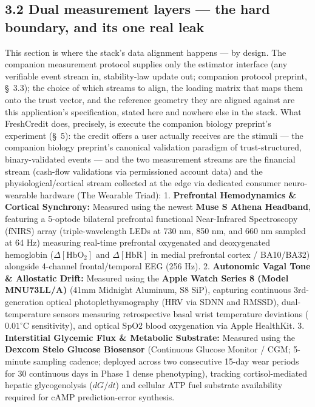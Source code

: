 \documentclass[
]{article}
\begin{document}
\subsection{3.2 Dual measurement layers --- the hard boundary, and its
one real
leak}\label{dual-measurement-layers-the-hard-boundary-and-its-one-real-leak}

This section is where the stack's data alignment happens --- by design.
The companion measurement protocol supplies only the estimator interface
(any verifiable event stream in, stability-law update out; companion
protocol preprint, §~3.3); the choice of which streams to align, the
loading matrix that maps them onto the trust vector, and the reference
geometry they are aligned against are this application's specification,
stated here and nowhere else in the stack. What FreshCredit does,
precisely, is execute the companion biology preprint's experiment (§~5):
the credit offers a user actually receives are the stimuli --- the
companion biology preprint's canonical validation paradigm of
trust-structured, binary-validated events --- and the two measurement
streams are the financial stream (cash-flow validations via permissioned
account data) and the physiological/cortical stream collected at the
edge via dedicated consumer neuro-wearable hardware (The Wearable
Triad): 1. \textbf{Prefrontal Hemodynamics \& Cortical Synchrony:}
Measured using the newest \textbf{Muse S Athena Headband}, featuring a
5-optode bilateral prefrontal functional Near-Infrared Spectroscopy
(fNIRS) array (triple-wavelength LEDs at 730 nm, 850 nm, and 660 nm
sampled at 64 Hz) measuring real-time prefrontal oxygenated and
deoxygenated hemoglobin (\(\Delta [\mathrm{HbO}_2]\) and
\(\Delta [\mathrm{HbR}]\) in medial prefrontal cortex / BA10/BA32)
alongside 4-channel frontal/temporal EEG (256 Hz). 2. \textbf{Autonomic
Vagal Tone \& Allostatic Drift:} Measured using the \textbf{Apple Watch
Series 8 (Model MNU73LL/A)} (41mm Midnight Aluminum, S8 SiP), capturing
continuous 3rd-generation optical photoplethysmography (HRV via SDNN and
RMSSD), dual-temperature sensors measuring retrospective basal wrist
temperature deviations (\(0.01^\circ\mathrm{C}\) sensitivity), and
optical SpO2 blood oxygenation via Apple HealthKit. 3.
\textbf{Interstitial Glycemic Flux \& Metabolic Substrate:} Measured
using the \textbf{Dexcom Stelo Glucose Biosensor} (Continuous Glucose
Monitor / CGM; 5-minute sampling cadence; deployed across two
consecutive 15-day wear periods for 30 continuous days in Phase 1 dense
phenotyping), tracking cortisol-mediated hepatic glycogenolysis
(\(dG/dt\)) and cellular ATP fuel substrate availability required for
cAMP prediction-error synthesis.
\end{document}
